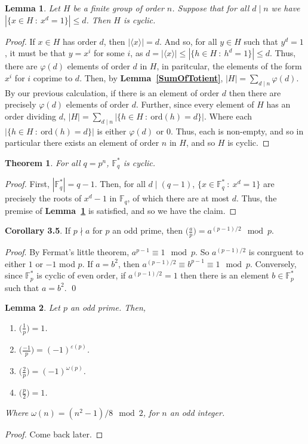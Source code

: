 \documentclass[12pt]{article}
\newcommand{\g}[1]{\langle #1 \rangle}
\newcommand{\ord}{\text{ord}}
\newcommand{\lref}[1]{\textbf{Lemma~\ref{#1}}}
\newtheorem{thm}{Theorem}
\newtheorem{lemma}{Lemma}
\numberwithin{equation}{section}
\numberwithin{thm}{section}
\numberwithin{lemma}{section}
\numberwithin{cor}{section}
\begin{document}
\begin{lemma}\label{CyclicGroupSufficientCondition}
  Let $H$ be a finite group of order $n$. Suppose that for all $d \mid n$ we have $|\{ x \in H \ : \ x^d = 1 \}| \leq d$. Then $H$ is cyclic.
\end{lemma}
\begin{proof}
  If $x \in H$ has order $d$, then $|\g{x}| = d$. And so, for all $y \in H$ such that $y^d = 1$, it must be that $y = x^i$ for some $i$, as $d = |\g{x}| \leq |\{ h \in H \ : \ h^d = 1 \}| \leq d$. Thus, there are $\varphi(d)$ elements of order $d$ in $H$, in paritcular, the elements of the form $x^i$ for $i$ coprime to $d$. Then, by \lref{SumOfTotient}, $|H| = \sum_{d \mid n} \varphi(d)$. By our previous calculation, if there is an element of order $d$ then there are precisely $\varphi(d)$ elements of order $d$. Further, since every element of $H$ has an order dividing $d$, $|H| = \sum_{d \mid n} |\{ h \in H \ : \ \ord(h) = d \}|$. Where each $|\{ h \in H \ : \ \ord(h) = d\}|$ is either $\varphi(d)$ or $0$. Thus, each is non-empty, and so in particular there exists an element of order $n$ in $H$, and so $H$ is cyclic.
\end{proof}

\begin{thm}
  For all $q = p^n$, $\mathbb{F}_q^*$ is cyclic.
\end{thm}
\begin{proof}
  First, $|\mathbb{F}_q^*| = q - 1$. Then, for all $d \mid (q - 1)$, $\{ x \in \mathbb{F}_q^* \ : \ x^d = 1 \}$ are precisely the roots of $x^d - 1$ in $\mathbb{F}_q$, of which there are at most $d$. Thus, the premise of \lref{CyclicGroupSufficientCondition} is satisfied, and so we have the claim.
\end{proof}

\textbf{Corollary 3.5}. If $p \nmid a$ for $p$ an odd prime, then $\big( \frac{a}{p} \big) = a^{(p-1)/2} \mod p$.

\textit{Proof}. By Fermat's little theorem, $a^{p-1} \equiv 1 \mod p$. So $a^{(p-1)/2}$ is conrguent to either $1$ or $-1$ mod $p$. If $a = b^2$, then $a^{(p-1)/2} \equiv b^{p-1} \equiv 1 \mod p$. Conversely, since $\mathbb{F}_p^*$ is cyclic of even order, if $a^{(p-1)/2} = 1$ then there is an element $b \in \mathbb{F}_p^*$ such that $a = b^2$. \qed

\begin{lemma}\label{QuadraticReciprocityFor2}
  Let $p$ an odd prime. Then, \begin{enumerate}
    \item $\big( \frac{1}{p} \big) = 1$.
    \item $\big( \frac{-1}{p} \big) = (-1)^{\varepsilon(p)}$.
    \item $\big( \frac{2}{p} \big) = (-1)^{\omega(p)}$.
    \item $\big( \frac{p}{2} \big) = 1$.
  \end{enumerate} Where $\omega(n) = (n^2 - 1)/8 \mod 2$, for $n$ an odd integer.
\end{lemma}
\begin{proof}
  Come back later.
\end{proof}
\end{document}
